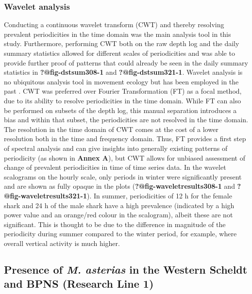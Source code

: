 \documentclass[
  authoryear,
  review,
  3p]{elsarticle}
\begin{document}
\hypertarget{sec-disc-reflection-wavelet}{%
\subsubsection{Wavelet analysis}\label{sec-disc-reflection-wavelet}}

Conducting a continuous wavelet transform (CWT) and thereby resolving
prevalent periodicities in the time domain was the main analysis tool in
this study. Furthermore, performing CWT both on the raw depth log and
the daily summary statistics allowed for different scales of
periodicities and was able to provide further proof of patterns that
could already be seen in the daily summary statistics in
\textbf{?@fig-dstsum308-1} and \textbf{?@fig-dstsum321-1}. Wavelet
analysis is no ubiquitous analysis tool in movement ecology but has been
employed in the past \citep{wittemyer_2008, zhang_2020}. CWT was
preferred over Fourier Transformation (FT) as a focal method, due to its
ability to resolve periodicities in the time domain. While FT can also
be performed on subsets of the depth log, this manual separation
introduces a bias and within that subset, the periodicities are not
resolved in the time domain. The resolution in the time domain of CWT
comes at the cost of a lower resolution both in the time and frequency
domain. Thus, FT provides a first step of spectral analysis and can give
insights into generally existing patterns of periodicity (as shown in
\textbf{Annex A}), but CWT allows for unbiased assessment of change of
prevalent periodicities in time of time series data. In the wavelet
scalograms on the hourly scale, only periods in winter were
significantly present and are shown as fully opaque in the plots
(\textbf{?@fig-waveletresults308-1} and
\textbf{?@fig-waveletresults321-1}). In summer, periodicities of 12 h
for the female shark and 24 h of the male shark have a high prevalence
(indicated by a high power value and an orange/red colour in the
scalogram), albeit these are not significant. This is thought to be due
to the difference in magnitude of the periodicity during summer compared
to the winter period, for example, where overall vertical activity is
much higher.

\hypertarget{sec-disc-seasonalpresencefemales}{%
\subsection{\texorpdfstring{Presence of \emph{M. asterias} in the
Western Scheldt and BPNS (Research Line
1)}{Presence of M. asterias in the Western Scheldt and BPNS (Research Line 1)}}\label{sec-disc-seasonalpresencefemales}}
\end{document}
